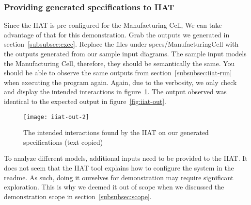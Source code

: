 \subsubsection{Providing generated specifications to IIAT}
Since the IIAT is pre-configured for the Manufacturing Cell,
We can take advantage of that for this demonstration.
Grab the outputs we generated in section~\ref{subsubsec:exec}.
Replace the files under specs/ManufacturingCell with the outputs generated from our sample input diagrams.
The sample input models the Manufacturing Cell, therefore, they should be semantically the same.
You should be able to observe the same outputs from section~\ref{subsubsec:iiat-run} when executing the program again.
Again, due to the verbosity, we only check and display the intended interactions in figure~\ref{fig:iiat-out2}.
The output observed was identical to the expected output in figure~\ref{fig:iiat-out}.
\begin{figure}[ht]
    \centering
    \texttt{[image: iiat-out-2]}
    \caption{The intended interactions found by the IIAT on our generated specifications (text copied)}
    \label{fig:iiat-out2}
\end{figure}
To analyze different models, additional inputs need to be provided to the IIAT\@.
It does not seem that the IIAT tool explains how to configure the system in the readme.
As such, doing it ourselves for demonstration may require significant exploration.
This is why we deemed it out of scope when we discussed the demonstration scope in section~\ref{subsubsec:scope}.